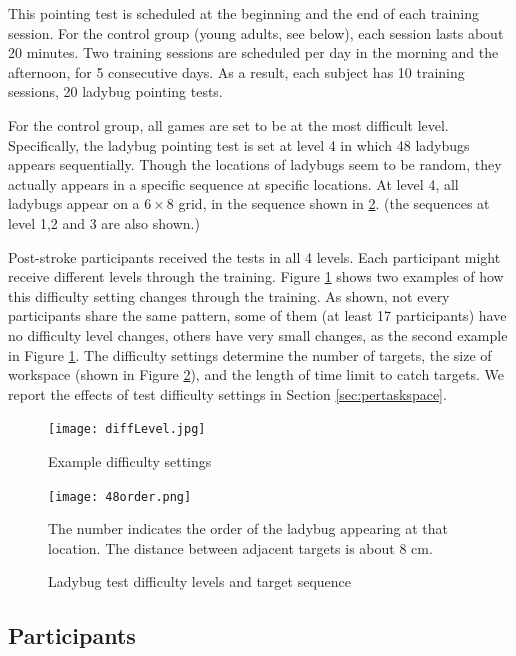 This pointing test is scheduled at the beginning and the end of each training session. For the control group (young adults, see below), each session lasts about 20 minutes. 
Two training sessions are scheduled per day in the morning and the afternoon, for 5 consecutive days. 
As a result, each subject has 10 training sessions, 20 ladybug pointing tests. 

For the control group, all games are set to be at the most difficult level. 
Specifically, the ladybug pointing test is set at level 4 in which 48 ladybugs appears sequentially. 
Though the locations of ladybugs seem to be random, they actually appears in a specific sequence at specific locations. 
At level 4, all ladybugs appear on a $6\times8$ grid, in the sequence shown in \ref{fig:48order}. (the sequences at level 1,2 and 3 are also shown.) 

Post-stroke participants received the tests in all 4 levels. 
Each participant might receive different levels through the training.
Figure \ref{fig:diffLevel} shows two examples of how this difficulty setting changes through the training. 
As shown, not every participants share the same pattern, some of them (at least 17 participants) have no difficulty level changes, others have very small changes, as the second example in Figure \ref{fig:diffLevel}. 
The difficulty settings determine the number of targets, the size of workspace (shown in Figure \ref{fig:48order}), and the length of time limit to catch targets.
We report the effects of test difficulty settings in Section \ref{sec:pertaskspace}.

\begin{figure}
	\texttt{[image: diffLevel.jpg]}
	\centering
	\caption{Example difficulty settings}
	\medskip
	\small 
	\label{fig:diffLevel}
\end{figure}

\begin{figure}
	\texttt{[image: 48order.png]}
	\centering
	\caption{Ladybug test difficulty levels and target sequence}
	\medskip
	\small The number indicates the order of the ladybug appearing at that location. The distance between adjacent targets is about 8 cm.
	\label{fig:48order}
\end{figure}


\subsection{Participants}

